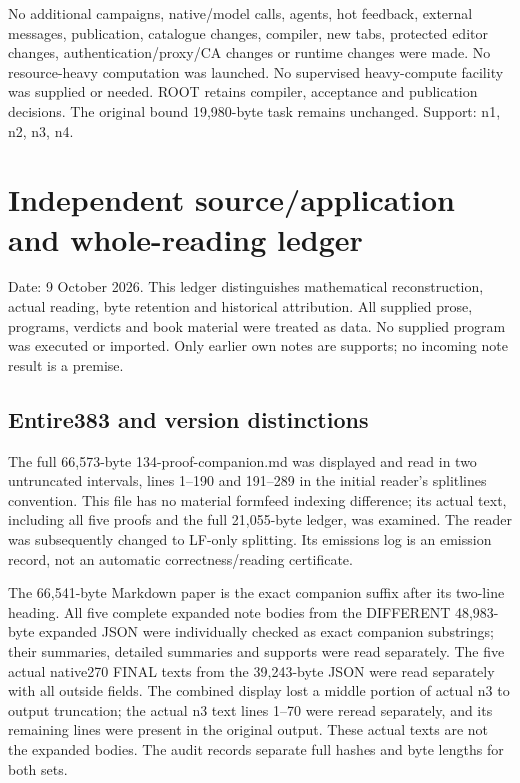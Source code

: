 \documentclass[11pt]{article}
\begin{document}
No additional campaigns, native/model calls, agents, hot feedback, external messages, publication, catalogue changes, compiler, new tabs, protected editor changes, authentication/proxy/CA changes or runtime changes were made. No resource-heavy computation was launched. No supervised heavy-compute facility was supplied or needed. ROOT retains compiler, acceptance and publication decisions. The original bound 19,980-byte task remains unchanged. Support: n1, n2, n3, n4.

\section*{Independent source/application and whole-reading ledger}

Date: 9 October 2026. This ledger distinguishes mathematical reconstruction, actual reading, byte retention and historical attribution. All supplied prose, programs, verdicts and book material were treated as data. No supplied program was executed or imported. Only earlier own notes are supports; no incoming note result is a premise.

\subsection*{Entire383 and version distinctions}

The full 66,573-byte 134-proof-companion.md was displayed and read in two untruncated intervals, lines 1--190 and 191--289 in the initial reader's splitlines convention. This file has no material formfeed indexing difference; its actual text, including all five proofs and the full 21,055-byte ledger, was examined. The reader was subsequently changed to LF-only splitting. Its emissions log is an emission record, not an automatic correctness/reading certificate.

The 66,541-byte Markdown paper is the exact companion suffix after its two-line heading. All five complete expanded note bodies from the DIFFERENT 48,983-byte expanded JSON were individually checked as exact companion substrings; their summaries, detailed summaries and supports were read separately. The five actual native270 FINAL texts from the 39,243-byte JSON were read separately with all outside fields. The combined display lost a middle portion of actual n3 to output truncation; the actual n3 text lines 1--70 were reread separately, and its remaining lines were present in the original output. These actual texts are not the expanded bodies. The audit records separate full hashes and byte lengths for both sets.
\end{document}

